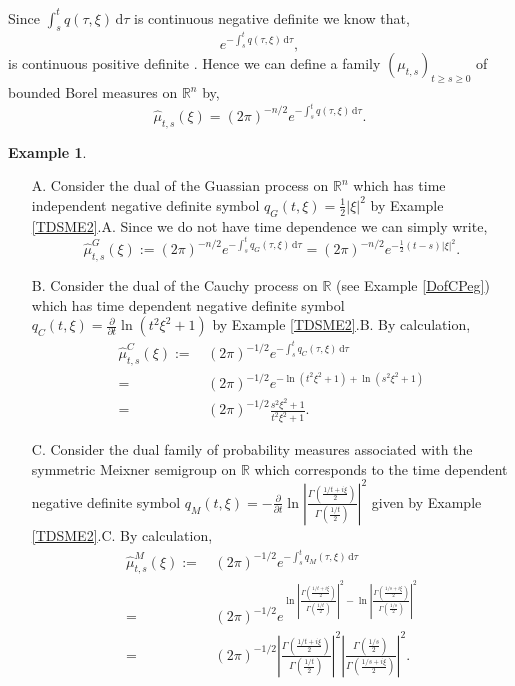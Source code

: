 \documentclass[a4paper, 12pt]{report}
\theoremstyle{cor}
\theoremstyle{remark}
\theoremstyle{definition}
\newtheorem{eg}[theorem]{Example}
\begin{document}
Since $\int_s^tq(\tau, \xi)\,\mathrm{d}\tau$ is continuous negative definite we know that,
$$
e^{-\int_s^tq(\tau, \xi)\,\mathrm{d}\tau},
$$
is continuous positive definite \cite[Corollary 3.6.17]{Vol1}.  Hence we can define a family $(\mu_{t, s})_{t \ge s \ge 0}$ of bounded Borel measures on $\mathbb{R}^n$ by,
\begin{equation}
\hat{\mu}_{t, s}(\xi) = (2\pi)^{-n/2}e^{-\int_s^tq(\tau, \xi)\,\mathrm{d}\tau}.\label{FBBM}
\end{equation}
\begin{eg}\label{TDSFSE1}
\hspace{0.5cm}
\begin{itemize}
\item[A.] Consider the dual of the Guassian process on $\mathbb{R}^n$ which has time independent negative definite symbol $q_G(t, \xi) = \frac{1}{2}|\xi|^2$ by Example \ref{TDSME2}.A.  Since we do not have time dependence we can simply write,
$$
\hat{\mu}_{t, s}^G(\xi) := (2\pi)^{-n/2}e^{-\int_s^tq_G(\tau, \xi)\,\mathrm{d}\tau} = (2\pi)^{-n/2}e^{-\frac{1}{2}(t - s)|\xi|^2}.
$$

\item[B.] Consider the dual of the Cauchy process on $\mathbb{R}$ (see Example \ref{DofCPeg}) which has time dependent negative definite symbol $q_C(t, \xi) = \frac{\partial}{\partial t}\ln(t^2\xi^2 + 1)$ by Example \ref{TDSME2}.B.  By calculation,
$$
\begin{aligned}
\hat{\mu}_{t, s}^C(\xi) := & \, (2\pi)^{-1/2}e^{-\int_s^tq_C(\tau, \xi)\,\mathrm{d}\tau}\\
= & \, (2\pi)^{-1/2}e^{-\ln(t^2\xi^2 + 1) + \ln(s^2\xi^2 + 1)}\\
= & \, (2\pi)^{-1/2}\frac{s^2\xi^2 + 1}{t^2\xi^2 + 1}.
\end{aligned}
$$

\item[C.] Consider the dual family of probability measures associated with the symmetric Meixner semigroup on $\mathbb{R}$ which corresponds to the time dependent negative definite symbol $q_M(t, \xi) = -\frac{\partial}{\partial t}\ln\left|\frac{\Gamma\left(\frac{1/t + i\xi}{2}\right)}{\Gamma\left(\frac{1/t}{2}\right)}\right|^2$ given by Example \ref{TDSME2}.C.  By calculation,
$$
\begin{aligned}
\hat{\mu}_{t, s}^M(\xi) := & \, (2\pi)^{-1/2}e^{-\int_s^tq_M(\tau, \xi)\,\mathrm{d}\tau}\\
= & \, (2\pi)^{-1/2}e^{\ln\left|\frac{\Gamma\left(\frac{1/t + i\xi}{2}\right)}{\Gamma\left(\frac{1/t}{2}\right)}\right|^2 - \ln\left|\frac{\Gamma\left(\frac{1/s + i\xi}{2}\right)}{\Gamma\left(\frac{1/s}{2}\right)}\right|^2}\\
= & \, (2\pi)^{-1/2}\left|\frac{\Gamma\left(\frac{1/t + i\xi}{2}\right)}{\Gamma\left(\frac{1/t}{2}\right)}\right|^2 \left|\frac{\Gamma\left(\frac{1/s}{2}\right)}{\Gamma\left(\frac{1/s + i\xi}{2}\right)}\right|^2.
\end{aligned}
$$
\end{itemize}
\end{eg}
\end{document}
